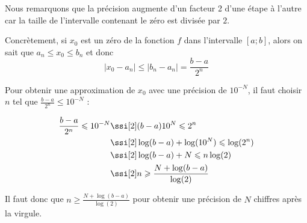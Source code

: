\smallskip
Nous remarquons que la précision augmente d'un facteur 2 d'une étape à l'autre car la taille de l'intervalle contenant le zéro est divisée par $2$.


\medskip
Concrètement, si $x_0$ est un zéro de la fonction $f$ dans l'intervalle $[a;b]$, alors on sait que $a_n \leqslant x_0 \leqslant b_n$ et donc $$|x_0-a_n| \leqslant |b_n-a_n| = \frac{b-a}{2^n}$$

Pour obtenir une approximation de $x_0$ avec une précision de $10^{-N}$, il faut choisir $n$ tel que  $\frac{b-a}{2^n} \leqslant 10^{-N}$ :

\setlength{\jot}{3mm}
\hspace*{2cm}\begin{minipage}{0.6\textwidth}\begin{align*}
\frac{b-a}{2^n} \leqslant 10^{-N}
 & \ssi[2] (b-a)10^N \leqslant 2^n  \\
 & \ssi[2] \log(b-a) + \log(10^N)  \leqslant \log(2^n) \\
 & \ssi[2] \log(b-a) + N \leqslant n \log(2) \\
 & \ssi[2] n \geqslant \frac{N +  \log(b-a)}{\log(2)} \\
\end{align*}\end{minipage}

\vspace{-2mm}
Il faut donc que $n \geqslant \frac{N +  \log(b-a)}{\log(2)}$ pour obtenir une précision de $N$ chiffres après la virgule. 
%

